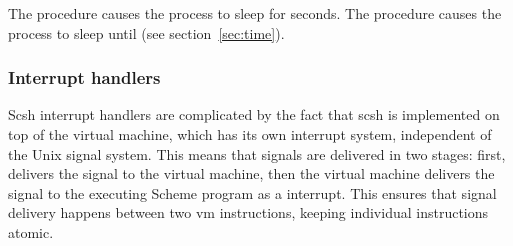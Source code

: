  \undefined
{}\undefined
\begin{desc}
  The  procedure causes the process to sleep for 
  seconds.  The  procedure causes the process to sleep
  until  (see section~\ref{sec:time}).  
  
\end{desc}

\subsubsection{Interrupt handlers}
\label{sec:int_handlers}
Scsh interrupt handlers are complicated by the fact that scsh is implemented on
top of the {\scm} virtual machine, which has its own interrupt system, 
independent of the Unix signal system.
This means that {\Unix} signals are delivered in two stages: first,
{\Unix} delivers the signal to the {\scm} virtual machine, then
the {\scm} virtual machine delivers the signal to the executing Scheme program
as a {\scm} interrupt.
This ensures that signal delivery happens between two vm instructions,
keeping individual instructions atomic.

